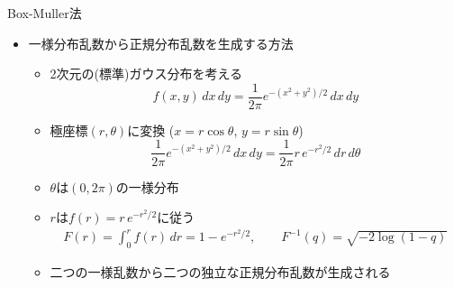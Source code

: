 
\begin{frame}[t,fragile]{Box-Muller法}
  \begin{itemize}
    \setlength{\itemsep}{1em}
  \item 一様分布乱数から正規分布乱数を生成する方法
    \begin{itemize}
    \item 2次元の(標準)ガウス分布を考える
      \[
      f(x,y)\,dx\,dy= \frac{1}{2\pi} e^{-(x^2+y^2)/2} \,dx\,dy
      \]
    \item 極座標$(r,\theta)$に変換 ($x=r\cos\theta$, $y=r\sin\theta$)
      \[
      \frac{1}{2\pi} e^{-(x^2+y^2)/2} \,dx\,dy = \frac{1}{2\pi} r \, e^{-r^2/2} \,dr\,d\theta
      \]
    \item $\theta$は$(0,2\pi)$の一様分布
    \item $r$は$f(r) = r \, e^{-r^2/2}$に従う
      \begin{align*}
        F(r) = \int_0^r f(r) \, dr = 1 - e^{-r^2/2}, \qquad F^{-1}(q) = \sqrt{- 2 \log(1-q)}
      \end{align*}
    \item 二つの一様乱数から二つの独立な正規分布乱数が生成される
    \end{itemize}
  \end{itemize}
\end{frame}
